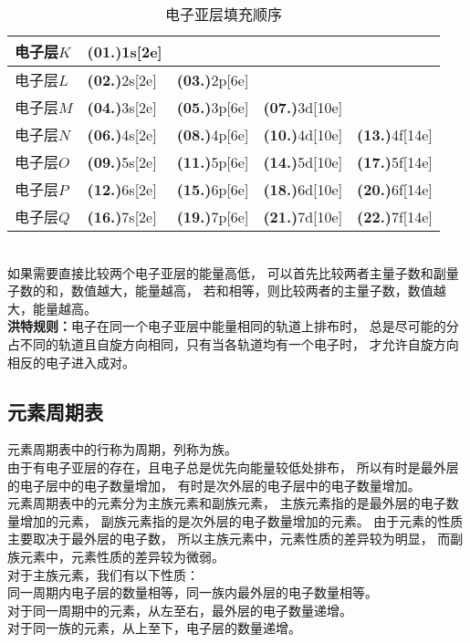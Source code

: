 \documentclass[UTF8]{ctexart}
\begin{document}
    \begin{table}[h]
        \begin{center}
            \begin{tabular}{l|l|l|l|l}
                \hline
                电子层$K$&\textbf{(01.)}\quad1s[2e]&&&\\ \hline
                电子层$L$&\textbf{(02.)}\quad2s[2e]&\textbf{(03.)}\quad2p[6e]&&\\ \hline
                电子层$M$&\textbf{(04.)}\quad3s[2e]&\textbf{(05.)}\quad3p[6e]&\textbf{(07.)}\quad3d[10e]&\\ \hline
                电子层$N$&\textbf{(06.)}\quad4s[2e]&\textbf{(08.)}\quad4p[6e]&\textbf{(10.)}\quad4d[10e]&\textbf{(13.)}\quad4f[14e]\\ \hline
                电子层$O$&\textbf{(09.)}\quad5s[2e]&\textbf{(11.)}\quad5p[6e]&\textbf{(14.)}\quad5d[10e]&\textbf{(17.)}\quad5f[14e]\\ \hline
                电子层$P$&\textbf{(12.)}\quad6s[2e]&\textbf{(15.)}\quad6p[6e]&\textbf{(18.)}\quad6d[10e]&\textbf{(20.)}\quad6f[14e]\\ \hline
                电子层$Q$&\textbf{(16.)}\quad7s[2e]&\textbf{(19.)}\quad7p[6e]&\textbf{(21.)}\quad7d[10e]&\textbf{(22.)}\quad7f[14e]\\ \hline
            \end{tabular}
            \caption{电子亚层填充顺序}
        \end{center}
    \end{table}\\
    如果需要直接比较两个电子亚层的能量高低，
    可以首先比较两者主量子数和副量子数的和，数值越大，能量越高，
    若和相等，则比较两者的主量子数，数值越大，能量越高。\\[6mm]
    \textbf{洪特规则：}电子在同一个电子亚层中能量相同的轨道上排布时，
    总是尽可能的分占不同的轨道且自旋方向相同，只有当各轨道均有一个电子时，
    才允许自旋方向相反的电子进入成对。

\newpage

\subsection{元素周期表}
    元素周期表中的行称为周期，列称为族。\\[3mm]
    由于有电子亚层的存在，且电子总是优先向能量较低处排布，
    所以有时是最外层的电子层中的电子数量增加，
    有时是次外层的电子层中的电子数量增加。\\[3mm]
    元素周期表中的元素分为主族元素和副族元素，
    主族元素指的是最外层的电子数量增加的元素，
    副族元素指的是次外层的电子数量增加的元素。
    由于元素的性质主要取决于最外层的电子数，
    所以主族元素中，元素性质的差异较为明显，
    而副族元素中，元素性质的差异较为微弱。\\[6mm]
    对于主族元素，我们有以下性质：\\[3mm]
    同一周期内电子层的数量相等，同一族内最外层的电子数量相等。\\[3mm]
    对于同一周期中的元素，从左至右，最外层的电子数量递增。\\[3mm]
    对于同一族的元素，从上至下，电子层的数量递增。\\
\end{document}
